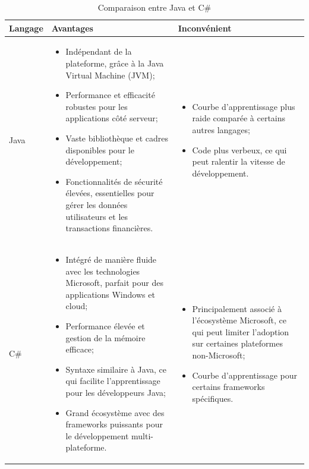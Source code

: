 \documentclass[12pt]{report}
\begin{document}
				\begin{longtable}{|p{2cm}|p{6cm}|p{6cm}|} 
						\caption{Comparaison entre Java et C\#} 
						\label{tab:backend}\\ 
						\hline 
						\textbf{Langage} & \textbf{Avantages} & \textbf{Inconvénient}\\ 
						\hline 
						\endfirsthead 	
						\endhead
						Java&
						\begin{itemize}
							\item Indépendant de la plateforme, grâce à la Java Virtual Machine (JVM);
							\item Performance et efficacité robustes pour les applications côté serveur;
							\item Vaste bibliothèque et cadres disponibles pour le développement;
							\item Fonctionnalités de sécurité élevées, essentielles pour gérer les données utilisateurs et les transactions financières.
						\end{itemize}
						&
						\begin{itemize}
							\item Courbe d'apprentissage plus raide comparée à certains autres langages;
							\item Code plus verbeux, ce qui peut ralentir la vitesse de développement.
						\end{itemize}\\						
						\hline
						C\# &
						\begin{itemize}
							\item Intégré de manière fluide avec les technologies Microsoft, parfait pour des applications Windows et cloud;
							\item Performance élevée et gestion de la mémoire efficace;
							\item Syntaxe similaire à Java, ce qui facilite l'apprentissage pour les développeurs Java;
							\item Grand écosystème avec des frameworks puissants pour le développement multi-plateforme.
						\end{itemize} &
						\begin{itemize}
							\item Principalement associé à l'écosystème Microsoft, ce qui peut limiter l'adoption sur certaines plateformes non-Microsoft;
							\item Courbe d'apprentissage pour certains frameworks spécifiques.
						\end{itemize} \\
						\hline
				    \end{longtable}
\end{document}

